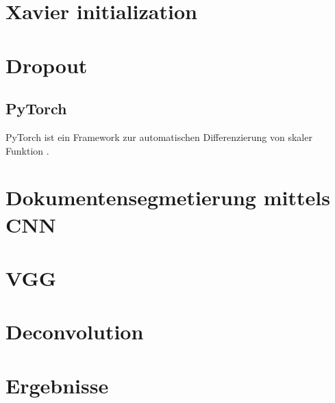 \section{Xavier initialization}
\section{Dropout}

\subsection{PyTorch}
PyTorch ist ein Framework zur automatischen Differenzierung von skaler Funktion \autocite{PaszkeAutomaticdifferentiationPyTorch2017}.

\section{Dokumentensegmetierung mittels CNN}



\section{\textcite{XuPageSegmentationHistorical2017}}
\section{VGG}
\section{Deconvolution}
\section{Ergebnisse}